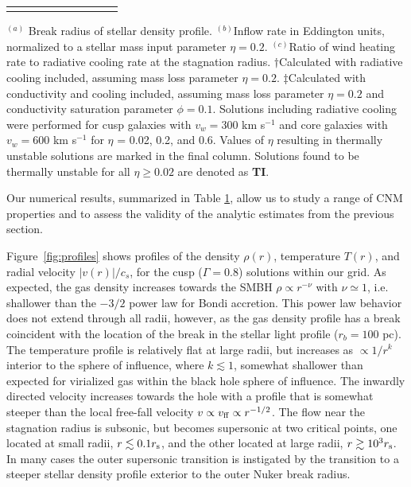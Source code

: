 \documentclass[usenatbib,fleqn]{mn2e}
\newcommand{\rb}{r_b}
\newcommand{\densSlope}{\nu}
\begin{document}
\begin{table}
\begin{threeparttable}
\begin{minipage}{18cm}
\begin{tabular}{lccccccccc}
\hline
\label{table:models}  
\end{tabular}
\begin{tablenotes}
\item $^{(a)}$ Break radius of stellar density profile.
  $^{(b)}$Inflow rate in Eddington units, normalized to a stellar mass
  input parameter $\eta = 0.2$.  $^{(c)}$Ratio of wind heating rate to
  radiative cooling rate at the stagnation radius. $\dagger$Calculated
  with radiative cooling included, assuming mass loss parameter $\eta
  = 0.2$.  $\ddagger$Calculated with conductivity and cooling
  included, assuming mass loss parameter $\eta = 0.2$ and conductivity
  saturation parameter $\phi = 0.1$.  Solutions including radiative
  cooling were performed for cusp galaxies with $v_w=300 $ km s$^{-1}$
  and core galaxies with $v_w=600 $ km s$^{-1}$ for $\eta$ = 0.02,
  0.2, and 0.6.  Values of $\eta$ resulting in thermally unstable
  solutions are marked in the final column.  Solutions found to be
  thermally unstable for all $\eta \geq 0.02$ are denoted as {\bf TI}.
\end{tablenotes}
\end{minipage}
\end{threeparttable}

\end{table}



Our numerical results, summarized in Table \ref{table:models}, allow
us to study a range of CNM properties and to assess the validity of
the analytic estimates from the previous section.  

Figure~\ref{fig:profiles} shows profiles of the density $\rho(r)$,
temperature $T(r)$, and radial velocity $|v(r)|/c_s$, for the cusp
($\Gamma=0.8$) solutions within our grid.  As expected, the gas
density increases towards the SMBH $\rho\propto r^{-\densSlope}$ with
$\densSlope\simeq1$, i.e. shallower than the $-3/2$ power law for
Bondi accretion. This power law behavior does not extend through all
radii, however, as the gas density profile has a break coincident with
the location of the break in the stellar light profile ($\rb=100$
pc). The temperature profile is relatively flat at large radii, but
increases as $\propto 1/r^{k}$ interior to the sphere of influence,
where $k\lesssim 1$, somewhat shallower than expected for virialized
gas within the black hole sphere of influence.  The inwardly directed
velocity increases towards the hole with a profile that is somewhat
steeper than the local free-fall velocity $v \propto v_{\rm ff}\propto
r^{-1/2}$.  The flow near the stagnation radius is subsonic, but
becomes supersonic at two critical points, one located at small radii,
$r \lesssim 0.1r_{\rm s}$, and the other located at large radii, $r
\gtrsim 10^{3}r_{\rm s}$.  In many cases the outer supersonic
transition is instigated by the transition to a steeper stellar
density profile exterior to the outer Nuker break radius.
\end{document}
